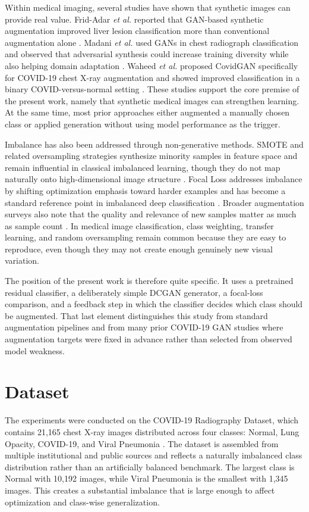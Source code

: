 \documentclass[conference]{IEEEtran}
\begin{document}
Within medical imaging, several studies have shown that synthetic images can provide real value. Frid-Adar \textit{et al.} reported that GAN-based synthetic augmentation improved liver lesion classification more than conventional augmentation alone \cite{fridadar2018}. Madani \textit{et al.} used GANs in chest radiograph classification and observed that adversarial synthesis could increase training diversity while also helping domain adaptation \cite{madani2018}. Waheed \textit{et al.} proposed CovidGAN specifically for COVID-19 chest X-ray augmentation and showed improved classification in a binary COVID-versus-normal setting \cite{waheed2020}. These studies support the core premise of the present work, namely that synthetic medical images can strengthen learning. At the same time, most prior approaches either augmented a manually chosen class or applied generation without using model performance as the trigger.

Imbalance has also been addressed through non-generative methods. SMOTE and related oversampling strategies synthesize minority samples in feature space and remain influential in classical imbalanced learning, though they do not map naturally onto high-dimensional image structure \cite{chawla2002}. Focal Loss addresses imbalance by shifting optimization emphasis toward harder examples and has become a standard reference point in imbalanced deep classification \cite{lin2017}. Broader augmentation surveys also note that the quality and relevance of new samples matter as much as sample count \cite{shorten2019}. In medical image classification, class weighting, transfer learning, and random oversampling remain common because they are easy to reproduce, even though they may not create enough genuinely new visual variation.

The position of the present work is therefore quite specific. It uses a pretrained residual classifier, a deliberately simple DCGAN generator, a focal-loss comparison, and a feedback step in which the classifier decides which class should be augmented. That last element distinguishes this study from standard augmentation pipelines and from many prior COVID-19 GAN studies where augmentation targets were fixed in advance rather than selected from observed model weakness.

\section{Dataset}
The experiments were conducted on the COVID-19 Radiography Dataset, which contains 21,165 chest X-ray images distributed across four classes: Normal, Lung Opacity, COVID-19, and Viral Pneumonia \cite{chowdhury2020}. The dataset is assembled from multiple institutional and public sources and reflects a naturally imbalanced class distribution rather than an artificially balanced benchmark. The largest class is Normal with 10,192 images, while Viral Pneumonia is the smallest with 1,345 images. This creates a substantial imbalance that is large enough to affect optimization and class-wise generalization.
\end{document}
